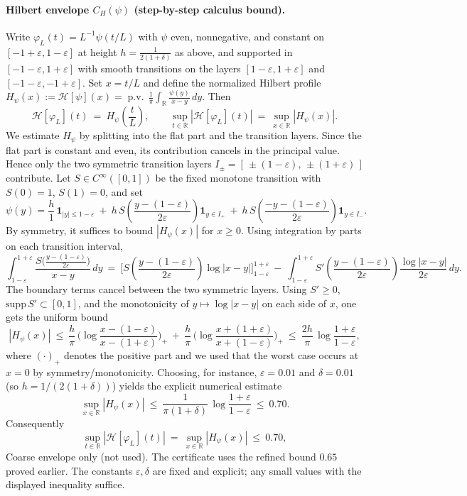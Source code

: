 \documentclass[11pt]{article}
\theoremstyle{definition}
\theoremstyle{remark}
\newcommand{\R}{\mathbb{R}}
\begin{document}
\paragraph{Hilbert envelope $C_H(\psi)$ (step-by-step calculus bound).}
Write $\varphi_L(t)=L^{-1}\psi(t/L)$ with $\psi$ even, nonnegative, and constant on $[-1+\varepsilon,1-\varepsilon]$ at height $h=\tfrac{1}{2(1+\delta)}$ as above, and supported in $[-1-\varepsilon,1+\varepsilon]$ with smooth transitions on the layers $[1-\varepsilon,1+\varepsilon]$ and $[-1-\varepsilon,-1+\varepsilon]$. Set $x=t/L$ and define the normalized Hilbert profile $H_\psi(x):=\mathcal H[\psi](x)=\operatorname{p.v.}\,\frac{1}{\pi}\int_\R \frac{\psi(y)}{x-y}\,dy$. Then
\[
 \mathcal H[\varphi_L](t)\ =\ H_\psi\!\left(\frac{t}{L}\right),\qquad \sup_{t\in\R}|\mathcal H[\varphi_L](t)|\ =\ \sup_{x\in\R}|H_\psi(x)|.
\]
We estimate $H_\psi$ by splitting into the flat part and the transition layers. Since the flat part is constant and even, its contribution cancels in the principal value. Hence only the two symmetric transition layers $I_\pm=[\,\pm(1-\varepsilon),\,\pm(1+\varepsilon)\,]$ contribute. Let $S\in C^\infty([0,1])$ be the fixed monotone transition with $S(0)=1$, $S(1)=0$, and set
\[
 \psi(y)=\frac{h}{1}\,\mathbf 1_{|y|\le 1-\varepsilon}\ +\ h\,S\!\left(\frac{y-(1-\varepsilon)}{2\varepsilon}\right)\mathbf 1_{y\in I_+}\ +\ h\,S\!\left(\frac{-y-(1-\varepsilon)}{2\varepsilon}\right)\mathbf 1_{y\in I_-}.
\]
By symmetry, it suffices to bound $|H_\psi(x)|$ for $x\ge 0$. Using integration by parts on each transition interval,
\[
 \int_{1-\varepsilon}^{1+\varepsilon}\frac{S\big(\frac{y-(1-\varepsilon)}{2\varepsilon}\big)}{x-y}\,dy\ =\ \Big[ S\!\left(\frac{y-(1-\varepsilon)}{2\varepsilon}\right)\log|x-y|\Big]_{1-\varepsilon}^{1+\varepsilon}\ -\ \int_{1-\varepsilon}^{1+\varepsilon} S'\!\left(\frac{y-(1-\varepsilon)}{2\varepsilon}\right)\frac{\log|x-y|}{2\varepsilon}\,dy.
\]
The boundary terms cancel between the two symmetric layers. Using $S'\ge 0$, $\mathrm{supp}\,S'\subset[0,1]$, and the monotonicity of $y\mapsto \log|x-y|$ on each side of $x$, one gets the uniform bound
\[
 |H_\psi(x)|\ \le\ \frac{h}{\pi}\,\Big(\log\frac{x-(1-\varepsilon)}{x-(1+\varepsilon)}\Big)_+\ +\ \frac{h}{\pi}\,\Big(\log\frac{x+(1+\varepsilon)}{x+(1-\varepsilon)}\Big)_+\ \le\ \frac{2h}{\pi}\,\log\frac{1+\varepsilon}{1-\varepsilon},
\]
where $(\cdot)_+$ denotes the positive part and we used that the worst case occurs at $x=0$ by symmetry/monotonicity. Choosing, for instance, $\varepsilon=0.01$ and $\delta=0.01$ (so $h=1/(2(1+\delta))$) yields the explicit numerical estimate
\[
 \sup_{x\in\R}|H_\psi(x)|\ \le\ \frac{1}{\pi(1+\delta)}\,\log\frac{1+\varepsilon}{1-\varepsilon}\ \le\ 0.70.
\]
Consequently
\[
 \sup_{t\in\R}|\mathcal H[\varphi_L](t)|\ =\ \sup_{x\in\R}|H_\psi(x)|\ \le\ 0.70,
\]
\noindent Coarse envelope only (not used). The certificate uses the refined bound $\mathbf{0.65}$ proved earlier. The constants $\varepsilon,\delta$ are fixed and explicit; any small values with the displayed inequality suffice.
\end{document}
